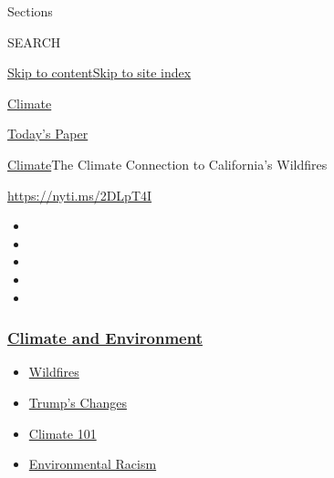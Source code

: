 Sections

SEARCH

\protect\hyperlink{site-content}{Skip to
content}\protect\hyperlink{site-index}{Skip to site index}

\href{https://www.nytimes3xbfgragh.onion/section/climate}{Climate}

\href{https://myaccount.nytimes3xbfgragh.onion/auth/login?response_type=cookie\&client_id=vi}{}

\href{https://www.nytimes3xbfgragh.onion/section/todayspaper}{Today's
Paper}

\href{/section/climate}{Climate}\textbar{}The Climate Connection to
California's Wildfires

\url{https://nyti.ms/2DLpT4I}

\begin{itemize}
\item
\item
\item
\item
\item
\end{itemize}

\hypertarget{climate-and-environment}{%
\subsubsection{\texorpdfstring{\href{https://www.nytimes3xbfgragh.onion/section/climate?name=styln-climate\&region=TOP_BANNER\&block=storyline_menu_recirc\&action=click\&pgtype=Article\&impression_id=34992300-f4c4-11ea-bc0c-2dd0f27298e1\&variant=undefined}{Climate
and
Environment}}{Climate and Environment}}\label{climate-and-environment}}

\begin{itemize}
\tightlist
\item
  \href{https://www.nytimes3xbfgragh.onion/2020/09/08/climate/california-wildfires-climate.html?name=styln-climate\&region=TOP_BANNER\&block=storyline_menu_recirc\&action=click\&pgtype=Article\&impression_id=34992301-f4c4-11ea-bc0c-2dd0f27298e1\&variant=undefined}{Wildfires}
\item
  \href{https://www.nytimes3xbfgragh.onion/interactive/2020/climate/trump-environment-rollbacks.html?name=styln-climate\&region=TOP_BANNER\&block=storyline_menu_recirc\&action=click\&pgtype=Article\&impression_id=34992302-f4c4-11ea-bc0c-2dd0f27298e1\&variant=undefined}{Trump's
  Changes}
\item
  \href{https://www.nytimes3xbfgragh.onion/interactive/2020/04/19/climate/climate-crash-course-1.html?name=styln-climate\&region=TOP_BANNER\&block=storyline_menu_recirc\&action=click\&pgtype=Article\&impression_id=34992303-f4c4-11ea-bc0c-2dd0f27298e1\&variant=undefined}{Climate
  101}
\item
  \href{https://www.nytimes3xbfgragh.onion/interactive/2020/08/24/climate/racism-redlining-cities-global-warming.html?name=styln-climate\&region=TOP_BANNER\&block=storyline_menu_recirc\&action=click\&pgtype=Article\&impression_id=34992304-f4c4-11ea-bc0c-2dd0f27298e1\&variant=undefined}{Environmental
  Racism}
\end{itemize}

